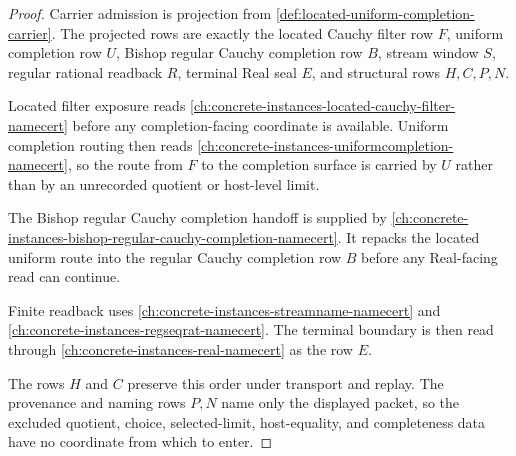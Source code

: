 \begin{proof}
Carrier admission is projection from \autoref{def:located-uniform-completion-carrier}. The projected rows are exactly the located Cauchy filter row $F$, uniform completion row $U$, Bishop regular Cauchy completion row $B$, stream window $S$, regular rational readback $R$, terminal Real seal $E$, and structural rows $H,C,P,N$.

Located filter exposure reads \autoref{ch:concrete-instances-located-cauchy-filter-namecert} before any completion-facing coordinate is available. Uniform completion routing then reads \autoref{ch:concrete-instances-uniformcompletion-namecert}, so the route from $F$ to the completion surface is carried by $U$ rather than by an unrecorded quotient or host-level limit.

The Bishop regular Cauchy completion handoff is supplied by \autoref{ch:concrete-instances-bishop-regular-cauchy-completion-namecert}. It repacks the located uniform route into the regular Cauchy completion row $B$ before any Real-facing read can continue.

Finite readback uses \autoref{ch:concrete-instances-streamname-namecert} and \autoref{ch:concrete-instances-regseqrat-namecert}. The terminal boundary is then read through \autoref{ch:concrete-instances-real-namecert} as the row $E$.

The rows $H$ and $C$ preserve this order under transport and replay. The provenance and naming rows $P,N$ name only the displayed packet, so the excluded quotient, choice, selected-limit, host-equality, and completeness data have no coordinate from which to enter.
\end{proof}

